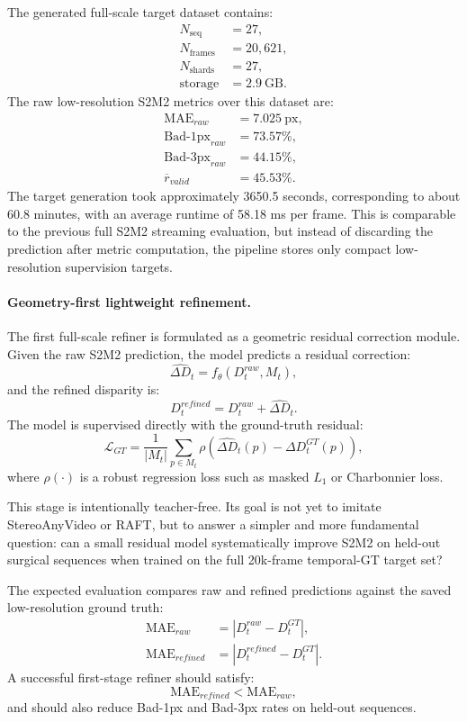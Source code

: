 \documentclass[11pt,a4paper]{article}
\begin{document}
The generated full-scale target dataset contains:
\[
\begin{aligned}
N_{\mathrm{seq}} &= 27, \\
N_{\mathrm{frames}} &= 20{,}621, \\
N_{\mathrm{shards}} &= 27, \\
\mathrm{storage} &= 2.9~\mathrm{GB}.
\end{aligned}
\]
The raw low-resolution S2M2 metrics over this dataset are:
\[
\begin{aligned}
\mathrm{MAE}_{raw} &= 7.025~\mathrm{px}, \\
\mathrm{Bad}\text{-}1\mathrm{px}_{raw} &= 73.57\%, \\
\mathrm{Bad}\text{-}3\mathrm{px}_{raw} &= 44.15\%, \\
\overline{r}_{valid} &= 45.53\%.
\end{aligned}
\]
The target generation took approximately 3650.5 seconds, corresponding to about
60.8 minutes, with an average runtime of 58.18 ms per frame. This is comparable
to the previous full S2M2 streaming evaluation, but instead of discarding the
prediction after metric computation, the pipeline stores only compact
low-resolution supervision targets.

\paragraph{Geometry-first lightweight refinement.}
The first full-scale refiner is formulated as a geometric residual correction
module. Given the raw S2M2 prediction, the model predicts a residual correction:
\[
\widehat{\Delta D}_t = f_{\theta}(D_t^{raw}, M_t),
\]
and the refined disparity is:
\[
D_t^{refined} = D_t^{raw} + \widehat{\Delta D}_t.
\]
The model is supervised directly with the ground-truth residual:
\[
\mathcal{L}_{GT}
=
\frac{1}{|M_t|}
\sum_{p \in M_t}
\rho
\left(
\widehat{\Delta D}_t(p) -
\Delta D_t^{GT}(p)
\right),
\]
where \(\rho(\cdot)\) is a robust regression loss such as masked \(L_1\) or
Charbonnier loss.

This stage is intentionally teacher-free. Its goal is not yet to imitate
StereoAnyVideo or RAFT, but to answer a simpler and more fundamental question:
can a small residual model systematically improve S2M2 on held-out surgical
sequences when trained on the full 20k-frame temporal-GT target set?

The expected evaluation compares raw and refined predictions against the saved
low-resolution ground truth:
\[
\begin{aligned}
\mathrm{MAE}_{raw}
&=
\left|D_t^{raw} - D_t^{GT}\right|, \\
\mathrm{MAE}_{refined}
&=
\left|D_t^{refined} - D_t^{GT}\right|.
\end{aligned}
\]
A successful first-stage refiner should satisfy:
\[
\mathrm{MAE}_{refined} < \mathrm{MAE}_{raw},
\]
and should also reduce Bad-1px and Bad-3px rates on held-out sequences.
\end{document}
